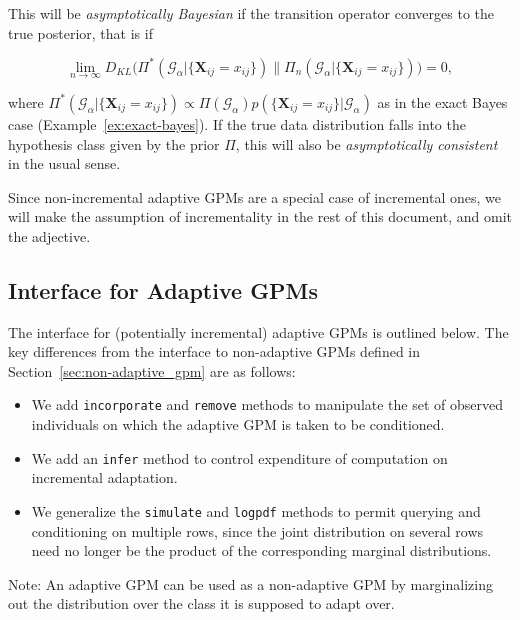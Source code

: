 \documentclass[10pt,letterpaper]{article}
\newcommand{\set}[1]{\{#1\}}
\newcommand{\G}{\mathcal{G}}
\begin{document}
This will be \emph{asymptotically Bayesian} if the transition operator
converges to the true posterior, that is if

\[ \lim_{n\to\infty}D_{KL}\Big(\Pi^*(\G_\alpha|\set{\mathbf{X}_{ij} = x_{ij}}) \Big\| \Pi_n(\G_\alpha|\set{\mathbf{X}_{ij} = x_{ij}})\Big) = 0, \]

where $\Pi^*(\G_\alpha|\set{\mathbf{X}_{ij}=x_{ij}}) \propto 
\Pi(\G_\alpha) p(\set{\mathbf{X}_{ij}=x_{ij}}|\G_\alpha)$
as in the exact Bayes case (Example~\ref{ex:exact-bayes}).
If the true data distribution falls into the hypothesis class given by
the prior $\Pi$, this will also be \emph{asymptotically consistent} in
the usual sense.

Since non-incremental adaptive GPMs are a special case of incremental
ones, we will make the assumption of incrementality in the rest of
this document, and omit the adjective.

\subsection{Interface for Adaptive GPMs}
\label{sec:adaptive_gpm}

The interface for (potentially incremental) adaptive GPMs is outlined
below.  The key differences from the interface to non-adaptive GPMs
defined in Section~\ref{sec:non-adaptive_gpm} are as follows:

\begin{itemize}
\item We add \texttt{incorporate} and \texttt{remove} methods to
  manipulate the set of observed individuals on which the adaptive GPM
  is taken to be conditioned.
\item We add an \texttt{infer} method to control expenditure of
  computation on incremental adaptation.
\item We generalize the \texttt{simulate} and \texttt{logpdf} methods
  to permit querying and conditioning on multiple rows, since the
  joint distribution on several rows need no longer be the product of
  the corresponding marginal distributions.
\end{itemize}

Note: An adaptive GPM can be used as a non-adaptive GPM by
marginalizing out the distribution over the class it is supposed to
adapt over.
\end{document}
